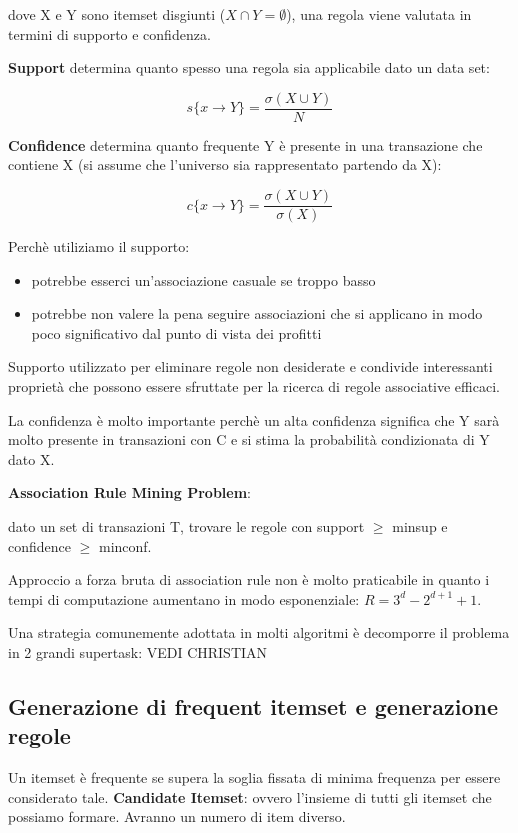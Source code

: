 dove X e Y sono itemset disgiunti ($X \cap Y = \emptyset$), una regola viene valutata in termini di supporto e confidenza.

\textbf{Support} determina quanto spesso una regola sia applicabile dato un data set:

\[s\{x \rightarrow Y\} = \frac{\sigma(X \cup Y)}{N}\]

\textbf{Confidence} determina quanto frequente Y \`e presente in una transazione che contiene X (si assume che l'universo sia rappresentato partendo da X):

\[c\{x \rightarrow Y\} = \frac{\sigma(X \cup Y)}{\sigma(X)}\]

Perch\`e utiliziamo il supporto:
\begin{itemize}
	\item potrebbe esserci un'associazione casuale se troppo basso
	\item potrebbe non valere la pena seguire associazioni che si applicano in modo poco significativo dal punto di vista dei profitti 
\end{itemize}
Supporto utilizzato per eliminare regole non desiderate e condivide interessanti propriet\`a che possono essere sfruttate per la ricerca di regole associative efficaci.

La confidenza \`e molto importante perch\`e un alta confidenza significa che Y sar\`a molto presente in transazioni con C e si stima la probabilit\`a  condizionata di Y dato X.

\textbf{Association Rule Mining Problem}:

dato un set di transazioni T, trovare le regole con support $\ge$ minsup e confidence $\ge$ minconf.

Approccio a forza bruta di association rule non \`e molto praticabile in quanto i tempi di computazione aumentano in modo esponenziale: $R = 3^d - 2^{d+1} + 1$.

Una strategia comunemente adottata in molti algoritmi \`e decomporre il problema in 2 grandi supertask:
VEDI CHRISTIAN


\subsection{Generazione di frequent itemset e generazione regole}

Un itemset \`e frequente se supera la soglia fissata di minima frequenza per essere considerato tale. 
\textbf{Candidate Itemset}: ovvero l'insieme di tutti gli itemset che possiamo formare. Avranno un numero di item diverso. 


